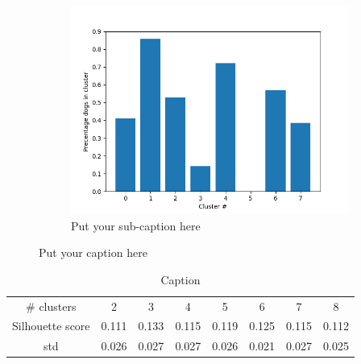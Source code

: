 \documentclass{article}
\begin{document}
\begin{figure}[ht]
\begin{subfigure}{.33\textwidth}
  \centering
  \includegraphics[width=1\linewidth]{1c/label overlapp 8 clusters.png}  
  \caption{Put your sub-caption here}
  \label{fig:sub-second}
\end{subfigure}
\caption{Put your caption here}
\label{LabelOverlap}
\end{figure}
\begin{table}[H]
    \centering
    \begin{tabular}{c|c|c|c|c|c|c|c}
        # clusters & 2& 3& 4& 5& 6& 7& 8  \\
       Silhouette score  & 0.111 & 0.133 & 0.115 & 0.119 &  0.125 &  0.115 &  0.112 \\
       std & 0.026 &  0.027 &  0.027 &  0.026 &  0.021 &  0.027 &  0.025 
    \end{tabular}
    \caption{Caption}
    \label{sill}
\end{table}
\end{document}
